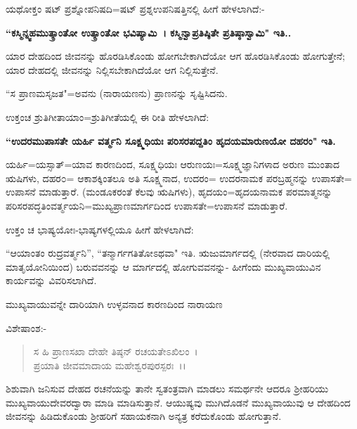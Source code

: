 ಯಥೋಕ್ತಂ ಷಟ್ ಪ್ರಶ್ನೋಪನಿಷದಿ=ಷಟ್ ಪ್ರಶ್ನಉಪನಿಷತ್ತಿನಲ್ಲಿ ಹೀಗೆ ಹೇಳಲಾಗಿದೆ:-

\textbf{``ಕಸ್ಮಿನ್ನ್ವಹಮುತ್ಕ್ರಾಂತೋ ಉತ್ಕ್ರಾಂತೋ ಭವಿಷ್ಯಾಮಿ~। ಕಸ್ಮಿನ್ವಾಪ್ರತಿಷ್ಠಿತೇ ಪ್ರತಿಷ್ಠಾಸ್ವಾಮಿ" ಇತಿ..}

ಯಾರ ದೇಹದಿಂದ ಜೀವನನ್ನು ಹೊರಡಿಸಿಕೊಂಡು ಹೋಗಬೇಕಾಗಿದೆಯೋ ಆಗ ಹೊರಡಿಸಿಕೊಂಡು ಹೋಗುತ್ತೇನೆ; ಯಾರ ದೇಹದಲ್ಲಿ ಜೀವನನ್ನು ನಿಲ್ಲಿಸಬೇಕಾಗಿದೆಯೋ ಆಗ ನಿಲ್ಲಿಸುತ್ತೇನೆ.

``ಸ ಪ್ರಾಣಮಸೃಜತ"=ಅವನು (ನಾರಾಯಣನು) ಪ್ರಾಣನನ್ನು ಸೃಷ್ಟಿಸಿದನು.

ಉಕ್ತಂಚ ಶ್ರುತಿಗೀತಾಯಾಂ=ಶ್ರುತಿಗೀತೆಯಲ್ಲಿ ಈ ರೀತಿ ಹೇಳಲಾಗಿದೆ:

\textbf{``ಉದರಮುಪಾಸತೇ ಯರ್ಹಿ ವರ್ತ್ಮನಿ ಸೂಕ್ಷ್ಮಧಿಯಃ ಪರಿಸರಪದ್ದತಿಂ ಹೃದಯಮಾರುಣಯೋ ದಹರಂ" ಇತಿ.}

ಯರ್ಹಿ=ಯಸ್ಸಾತ್=ಯಾವ ಕಾರಣದಿಂದ, ಸೂಕ್ಷ್ಮಧಿಯಃ ಆರುಣಯಃ=ಸೂಕ್ಷ್ಮಜ್ಞಾನಿಗಳಾದ ಅರುಣ ಮುಂತಾದ ಋಷಿಗಳು, ದಹರ೦= ಆಕಾಶಕ್ಕಿಂತಲೂ ಅತಿ ಸೂಕ್ಷ್ಮನಾದ, ಉದರಂ= ಉದರನಾಮಕ ಪರಬ್ರಹ್ಮನನ್ನು ಉಪಾಸತೇ= ಉಪಾಸನೆ ಮಾಡುತ್ತಾರೆ. (ಮಂಡೂಕರಂತೆ ಕೆಲವು ಋಷಿಗಳು), ಹೃದಯಂ=ಹೃದಯನಾಮಕ ಪರಮಾತ್ಮನನ್ನು ಪರಿಸರಪದ್ಧತಿಂವರ್ತ್ಮಯನಿ=ಮುಖ್ಯಪ್ರಾಣಮಾರ್ಗದಿಂದ ಉಪಾಸತೇ=ಉಪಾಸನೆ ಮಾಡುತ್ತಾರೆ.

ಉಕ್ತಂ ಚ ಭಾಷ್ಯಯೋಃ-ಭಾಷ್ಯಗಳಲ್ಲಿಯೂ ಹೀಗೆ ಹೇಳಲಾಗಿದೆ:

``ಆಯಾಂತಂ ರುದ್ರವರ್ತ್ಮನಿ'', ``ತನ್ಮಾರ್ಗಗತಿತೋಽಥವಾ" ಇತಿ. ಋಜುಮಾರ್ಗದಲ್ಲಿ (ನೇರವಾದ ದಾರಿಯಲ್ಲಿ ಮಾತೃಯೋನಿಯಿಂದ) ಬರುವವನನ್ನು ಆ ಮಾರ್ಗದಲ್ಲಿ ಹೋಗುವವನನ್ನು- ಹೀಗೆಂದು ಮುಖ್ಯವಾಯುವಿನ ಕಾರ್ಯವನ್ನು ವಿವರಿಸಲಾಗಿದೆ.

\begin{center}
ಮುಖ್ಯವಾಯುವನ್ನೇ ದಾರಿಯಾಗಿ ಉಳ್ಳವನಾದ ಕಾರಣದಿಂದ ನಾರಾಯಣ
\end{center}

\noindent
ವಿಶೇಷಾಂಶ:-

\begin{verse}
ಸ ಹಿ ಪ್ರಾಣಸಖಾ ದೇಹೇ ತಿಷ್ಠನ್ ರಚಯತೇಽಖಿಲಂ~।\\ ಪ್ರಯಾತಿ ಜೀವಮಾದಾಯ ಮಹೇಶ್ವರಪುರಸ್ಪರಃ~।।
\end{verse}


\noindent
ಶಿಶುವಾಗಿ ಜನಿಸುವ ದೇಹದ ರಚನೆಯನ್ನು ತಾನೇ ಸ್ವತಂತ್ರವಾಗಿ ಮಾಡಲು ಸಮರ್ಥನೇ ಆದರೂ ಶ‍್ರೀಹರಿಯು ಮುಖ್ಯವಾಯುದೇವರದ್ವಾರಾ ಮಾಡಿ ಮಾಡಿಸುತ್ತಾನೆ. ಆಯುಷ್ಯವು ಮುಗಿದೊಡನೆ ಮುಖ್ಯವಾಯುವು ಆ ದೇಹದಿಂದ ಜೀವನನ್ನು ಹಿಡಿದುಕೊಂಡು ಶ‍್ರೀಹರಿಗೆ ಸಹಾಯಕನಾಗಿ ಅನ್ಯತ್ರ ಕರೆದುಕೊಂಡು ಹೋಗುತ್ತಾನೆ.

